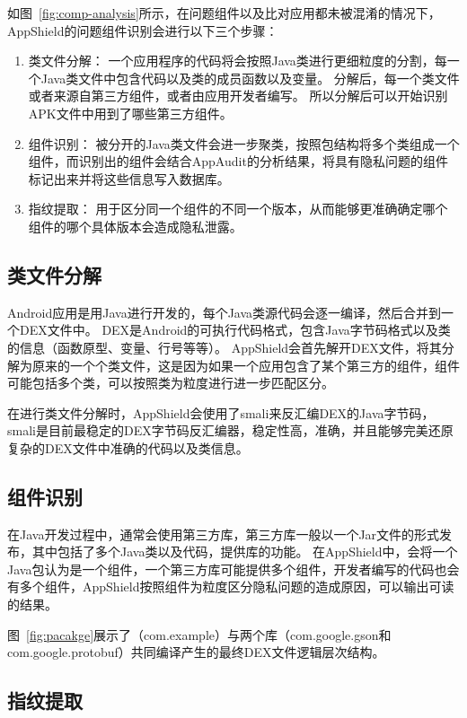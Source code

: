 如图~\ref{fig:comp-analysis}所示，在问题组件以及比对应用都未被混淆的情况下，AppShield的问题组件识别会进行以下三个步骤：

\begin{enumerate}
	\item 类文件分解：
		一个应用程序的代码将会按照Java类进行更细粒度的分割，每一个Java类文件中包含代码以及类的成员函数以及变量。
		分解后，每一个类文件或者来源自第三方组件，或者由应用开发者编写。
		所以分解后可以开始识别APK文件中用到了哪些第三方组件。
	\item 组件识别：
		被分开的Java类文件会进一步聚类，按照包结构将多个类组成一个组件，而识别出的组件会结合AppAudit的分析结果，将具有隐私问题的组件标记出来并将这些信息写入数据库。
	\item 指纹提取：
		用于区分同一个组件的不同一个版本，从而能够更准确确定哪个组件的哪个具体版本会造成隐私泄露。
\end{enumerate}

\subsection{类文件分解}
Android应用是用Java进行开发的，每个Java类源代码会逐一编译，然后合并到一个DEX文件中。
DEX是Android的可执行代码格式，包含Java字节码格式以及类的信息（函数原型、变量、行号等等）。
AppShield会首先解开DEX文件，将其分解为原来的一个个类文件，这是因为如果一个应用包含了某个第三方的组件，组件可能包括多个类，可以按照类为粒度进行进一步匹配区分。

在进行类文件分解时，AppShield会使用了smali来反汇编DEX的Java字节码，smali是目前最稳定的DEX字节码反汇编器，稳定性高，准确，并且能够完美还原复杂的DEX文件中准确的代码以及类信息。

\subsection{组件识别}

在Java开发过程中，通常会使用第三方库，第三方库一般以一个Jar文件的形式发布，其中包括了多个Java类以及代码，提供库的功能。
在AppShield中，会将一个Java包认为是一个组件，一个第三方库可能提供多个组件，开发者编写的代码也会有多个组件，AppShield按照组件为粒度区分隐私问题的造成原因，可以输出可读的结果。


图~\ref{fig:pacakge}展示了（com.example）与两个库（com.google.gson和com.google.protobuf）共同编译产生的最终DEX文件逻辑层次结构。

\subsection{指纹提取}

